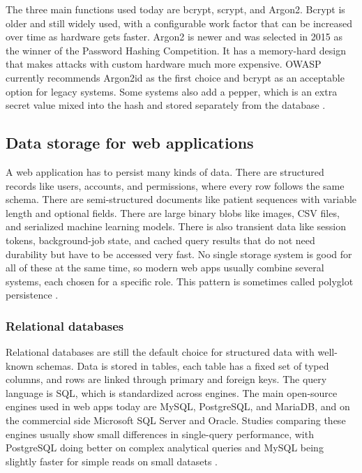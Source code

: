 The three main functions used today are bcrypt, scrypt, and Argon2. Bcrypt is older and still widely used, with a configurable work factor that can be increased over time as hardware gets faster. Argon2 is newer and was selected in 2015 as the winner of the Password Hashing Competition. It has a memory-hard design that makes attacks with custom hardware much more expensive. OWASP currently recommends Argon2id as the first choice and bcrypt as an acceptable option for legacy systems. Some systems also add a pepper, which is an extra secret value mixed into the hash and stored separately from the database \autocite{owasp_password_storage_2024, phc_argon2_2015}.

\subsection{Data storage for web applications}
\label{sec:data-storage}

A web application has to persist many kinds of data. There are structured records like users, accounts, and permissions, where every row follows the same schema. There are semi-structured documents like patient sequences with variable length and optional fields. There are large binary blobs like images, CSV files, and serialized machine learning models. There is also transient data like session tokens, background-job state, and cached query results that do not need durability but have to be accessed very fast. No single storage system is good for all of these at the same time, so modern web apps usually combine several systems, each chosen for a specific role. This pattern is sometimes called polyglot persistence \autocite{khan2022sqlnosql, moniruzzaman2013nosql}.

\subsubsection{Relational databases}
\label{sec:relational-db}

Relational databases are still the default choice for structured data with well-known schemas. Data is stored in tables, each table has a fixed set of typed columns, and rows are linked through primary and foreign keys. The query language is SQL, which is standardized across engines. The main open-source engines used in web apps today are MySQL, PostgreSQL, and MariaDB, and on the commercial side Microsoft SQL Server and Oracle. Studies comparing these engines usually show small differences in single-query performance, with PostgreSQL doing better on complex analytical queries and MySQL being slightly faster for simple reads on small datasets \autocite{wodyk2020sql_frameworks, khan2022sqlnosql}.

